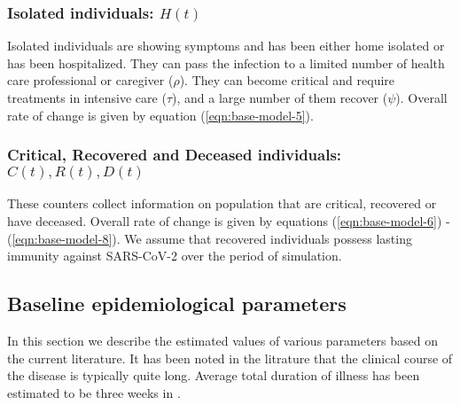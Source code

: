 \documentclass[authoryear,preprint]{elsarticle}
\begin{document}
\subsubsection{Isolated individuals: $H(t)$}
Isolated individuals are showing symptoms and has been either home isolated or has been hospitalized. They can pass the infection to a limited number of health care professional or caregiver ($\rho$). They can become critical and require treatments in intensive care ($\tau$), and a large number of them recover ($\psi$). Overall rate of change is given by equation (\ref{eqn:base-model-5}).

\subsubsection{Critical, Recovered and Deceased individuals: $C(t), R(t), D(t)$}
These counters collect information on population that are critical, recovered or have deceased. Overall rate of change is given by equations (\ref{eqn:base-model-6}) -  (\ref{eqn:base-model-8}). We assume that recovered individuals possess lasting immunity against SARS-CoV-2 over the period of simulation.

\subsection{Baseline epidemiological parameters}
In this section we describe the estimated values of various parameters based on the current literature. It has been noted in the litrature that the clinical course of the disease is typically quite long. Average total duration of illness has been estimated to be three weeks in \cite{Zhou2020}. \cite{Hu2020}  \cite{Long2020}
\cite{LIANG2020.03.31.20049387}
\end{document}
